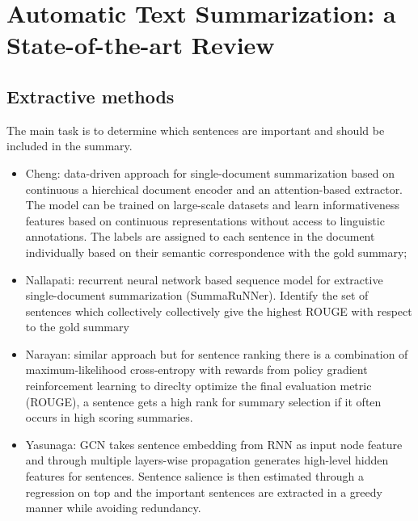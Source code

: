 \documentclass[12pt]{article}
\begin{document}
\section{Automatic Text Summarization: a State-of-the-art Review}
\subsection{Extractive methods}
The main task is to determine which sentences are important and should 
be included in the summary. 
\begin{itemize}
    \item Cheng: data-driven approach for single-document summarization based on continuous a 
    hierchical document encoder and an attention-based extractor. The model can be trained on large-scale
    datasets and learn informativeness features based on continuous representations without 
    access to linguistic annotations. The labels are assigned to each sentence in the 
    document individually based on their semantic correspondence with the gold summary;
    \item Nallapati: recurrent neural network based sequence model for extractive single-document
    summarization (SummaRuNNer). Identify the set of sentences which collectively collectively give the 
    highest ROUGE with respect to the gold summary
    \item Narayan: similar approach but for sentence ranking there is a combination of maximum-likelihood cross-entropy
    with rewards from policy gradient reinforcement learning to direclty optimize the final evaluation
    metric (ROUGE), a sentence gets a high rank for summary selection if it often occurs in high
    scoring summaries.
    \item Yasunaga: GCN takes sentence embedding from RNN as input node feature and through 
    multiple layers-wise propagation generates high-level hidden features for sentences. Sentence salience is then estimated
    through a regression on top and the important sentences are extracted in a greedy 
    manner while avoiding redundancy.

\end{itemize}
\end{document}
